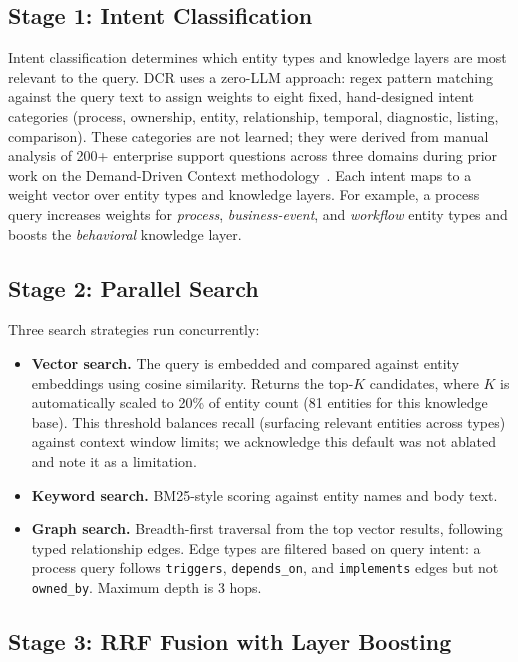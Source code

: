 \documentclass[11pt,a4paper]{article}
\begin{document}
\subsection{Stage 1: Intent Classification}

Intent classification determines which entity types and knowledge layers are most relevant to the query. DCR uses a zero-LLM approach: regex pattern matching against the query text to assign weights to eight fixed, hand-designed intent categories (process, ownership, entity, relationship, temporal, diagnostic, listing, comparison). These categories are not learned; they were derived from manual analysis of 200+ enterprise support questions across three domains during prior work on the Demand-Driven Context methodology~\citep{navakoti2026ddc}. Each intent maps to a weight vector over entity types and knowledge layers. For example, a process query increases weights for \textit{process}, \textit{business-event}, and \textit{workflow} entity types and boosts the \textit{behavioral} knowledge layer.

\subsection{Stage 2: Parallel Search}

Three search strategies run concurrently:

\begin{itemize}[nosep]
  \item \textbf{Vector search.} The query is embedded and compared against entity embeddings using cosine similarity. Returns the top-$K$ candidates, where $K$ is automatically scaled to 20\% of entity count (81 entities for this knowledge base). This threshold balances recall (surfacing relevant entities across types) against context window limits; we acknowledge this default was not ablated and note it as a limitation.
  \item \textbf{Keyword search.} BM25-style scoring against entity names and body text.
  \item \textbf{Graph search.} Breadth-first traversal from the top vector results, following typed relationship edges. Edge types are filtered based on query intent: a process query follows \texttt{triggers}, \texttt{depends\_on}, and \texttt{implements} edges but not \texttt{owned\_by}. Maximum depth is 3 hops.
\end{itemize}

\subsection{Stage 3: RRF Fusion with Layer Boosting}
\end{document}
